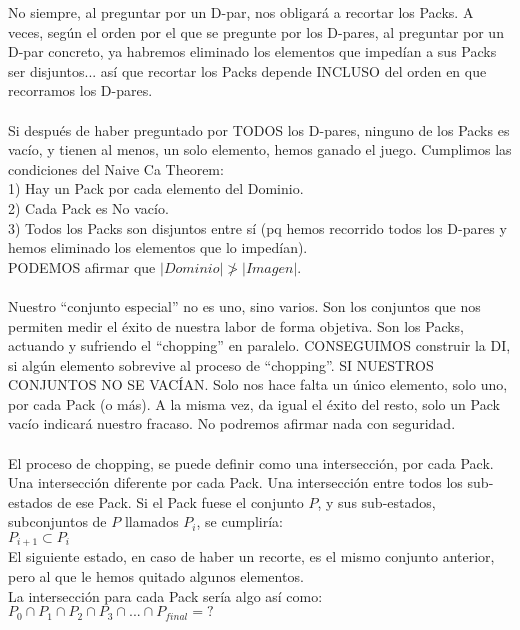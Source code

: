 	\noindent
	No siempre, al preguntar por un D-par, nos obligará a recortar los Packs. A veces, según el orden por el que se pregunte por los D-pares, al preguntar por un D-par concreto, ya habremos eliminado los elementos que impedían a sus Packs ser disjuntos... así que recortar los Packs depende INCLUSO del orden en que recorramos los D-pares.
	\\\\
	
	\noindent
	Si después de haber preguntado por TODOS los D-pares, ninguno de los Packs es vacío, y tienen al menos, un solo elemento, hemos ganado el juego. Cumplimos las condiciones del Naive Ca Theorem:\\
	1) Hay un Pack por cada elemento del Dominio.\\
	2) Cada Pack es No vacío.\\
	3) Todos los Packs son disjuntos entre sí (pq hemos recorrido todos los D-pares y hemos eliminado los elementos que lo impedían).\\
	PODEMOS afirmar que $|Dominio|\ngtr |Imagen|$.
	\\\\
	
	\noindent
	Nuestro ``conjunto especial'' no es uno, sino varios. Son los conjuntos que nos permiten medir el éxito de nuestra labor de forma objetiva. Son los Packs, actuando y sufriendo el ``chopping'' en paralelo. CONSEGUIMOS construir la DI, si algún elemento sobrevive al proceso de ``chopping''. SI NUESTROS CONJUNTOS NO SE VACÍAN. Solo nos hace falta un único elemento, solo uno, por cada Pack (o más). A la misma vez, da igual el éxito del resto, solo un Pack vacío indicará nuestro fracaso. No podremos afirmar nada con seguridad.
	\\\\
	
	\noindent
	El proceso de chopping, se puede definir como una intersección, por cada Pack. Una intersección diferente por cada Pack. Una intersección entre todos los sub-estados de ese Pack. Si el Pack fuese el conjunto $P$, y sus sub-estados, subconjuntos de $P$ llamados $P_{i}$, se cumpliría:\\
	$P_{i+1} \subset P_{i}$\\
	El siguiente estado, en caso de haber un recorte, es el mismo conjunto anterior, pero al que le hemos quitado algunos elementos.\\
	La intersección para cada Pack sería algo así como:\\
	$P_{0} \cap P_{1} \cap P_{2} \cap P_{3} \cap ... \cap P_{final}= ?$
	\\\\
	
